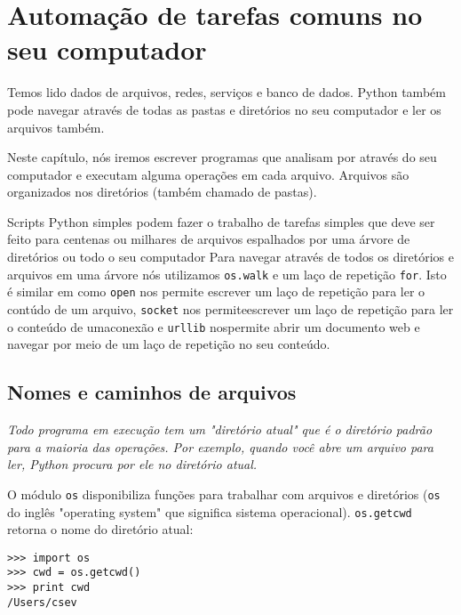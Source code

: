 
\chapter{Automação de tarefas comuns no seu computador}

Temos lido dados de arquivos, redes, serviços e banco de dados.
Python também pode navegar através de todas as pastas e diretórios 
no seu computador e ler os arquivos também.

Neste capítulo, nós iremos escrever programas que analisam por através do seu computador e executam alguma operações em cada arquivo. Arquivos são organizados nos diretórios (também chamado de pastas).

Scripts Python simples podem fazer o trabalho de tarefas simples que deve ser feito para
centenas ou milhares de arquivos espalhados por uma árvore de diretórios ou todo o seu computador
Para navegar através de todos os diretórios e arquivos em uma árvore nós utilizamos 
{\tt os.walk} e um laço de repetição {\tt for}. Isto é similar em como {\tt open} nos permite escrever um laço de repetição para ler o contúdo de um arquivo, {\tt socket} nos permiteescrever um laço de repetição para ler o conteúdo de umaconexão e {\tt urllib} nospermite abrir um documento web e navegar por meio de um laço de repetição no seu conteúdo. 

\section{Nomes e caminhos de arquivos}

\label{paths}


{\it Todo programa em execução tem um "diretório atual" que é o diretório padrão para a maioria das operações. Por exemplo, quando você abre um arquivo para ler, Python procura por ele no diretório atual.}


O módulo {\tt os} disponibiliza funções para trabalhar com arquivos e diretórios ({\tt os} do inglês "operating system" que significa sistema operacional).  
{\tt os.getcwd} retorna o nome do diretório atual:


\begin{verbatim}
>>> import os
>>> cwd = os.getcwd()
>>> print cwd
/Users/csev
\end{verbatim}

